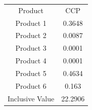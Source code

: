 \begin{tabular}{cc}
Product & CCP \\
Product 1 & 0.3648 \\
Product 2 & 0.0087 \\
Product 3 & 0.0001 \\
Product 4 & 0.0001 \\
Product 5 & 0.4634 \\
Product 6 & 0.163 \\
Inclusive Value & 22.2906 \\
\end{tabular}